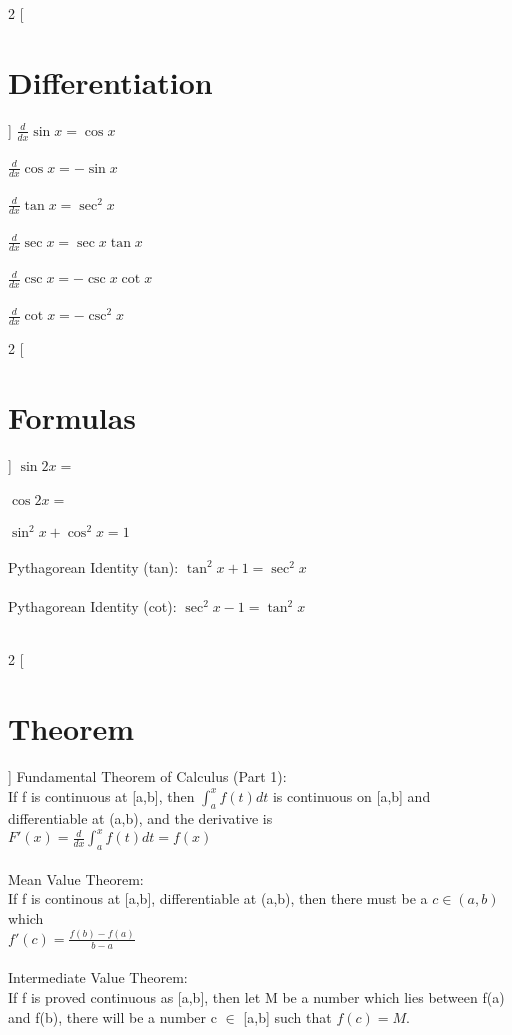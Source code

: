 \documentclass{exam}
\begin{document}
\begin{multicols}{2}
[
\section{Differentiation}
]
\noindent
$\frac{d}{dx}\sin x = \cos x$ \\\\
$\frac{d}{dx}\cos x = -\sin x$ \\\\
$\frac{d}{dx}\tan x = \sec ^2x$ \\\\
$\frac{d}{dx}\sec x = \sec x\tan x$ \\\\
$\frac{d}{dx}\csc x = -\csc x\cot x$ \\\\
$\frac{d}{dx}\cot x = -\csc ^2x$ \\
\end{multicols}
\begin{multicols}{2}
[
\section{Formulas}
]
$\sin 2x = $\\\\
$\cos 2x = $\\\\
$\sin ^2x + \cos^2x = 1$\\\\
Pythagorean Identity (tan): $\tan^2 x + 1 = \sec^2 x$\\\\
Pythagorean Identity (cot): $\sec^2 x - 1 = \tan^2 x$\\\\
\end{multicols}
\begin{multicols}{2}
[\section {Theorem}]
Fundamental Theorem of Calculus (Part 1):\\ If f is continuous at [a,b], then $\int_a^x f(t)dt$ is continuous on [a,b] and differentiable at (a,b), and the derivative is \\$F'(x) = \frac{d}{dx} \int_a^x f(t)dt = f(x)$ \\\\
Mean Value Theorem:\\
If f is continous at [a,b],
differentiable at (a,b), 
then there must be a $c \in (a,b)$ which\\
$f'(c) = \frac{f(b)-f(a)}{b-a}$\\\\
Intermediate Value Theorem: \\
If f is proved continuous as [a,b], then let M be a number which lies between f(a) and f(b), there will be a number c $\in$ [a,b] such that $f(c) = M$. \\\\\\
\end{multicols}
\end{document}
